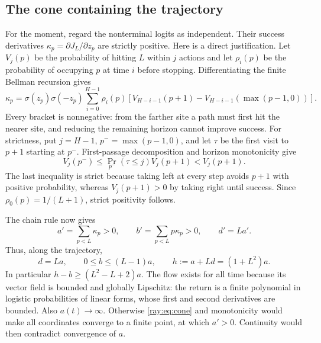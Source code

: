 \documentclass[11pt]{article}
\begin{document}
\subsection{The cone containing the trajectory}
For the moment, regard the nonterminal logits as independent. Their
success derivatives $\kappa_p=\partial J_L/\partial z_p$ are strictly
positive. Here is a direct justification. Let $V_j(p)$ be the probability
of hitting $L$ within $j$ actions and let $\rho_i(p)$ be the probability
of occupying $p$ at time $i$ before stopping. Differentiating the finite
Bellman recursion gives
\[
 \kappa_p=\sigma(z_p)\sigma(-z_p)
 \sum_{i=0}^{H-1}\rho_i(p)
 [V_{H-i-1}(p+1)-V_{H-i-1}(\max(p-1,0))].
\]
Every bracket is nonnegative: from the farther site a path must first
hit the nearer site, and reducing the remaining horizon cannot improve
success. For strictness, put $j=H-1$, $p^-=\max(p-1,0)$, and let $\tau$ be
the first visit to $p+1$ starting at $p^-$. First-passage decomposition and
horizon monotonicity give
\[
 V_j(p^-)\le\Pr_{p^-}(\tau\le j)V_j(p+1)<V_j(p+1).
\]
The last inequality is strict because taking left at every step avoids
$p+1$ with positive probability, whereas $V_j(p+1)>0$ by taking right
until success. Since $\rho_0(p)=1/(L+1)$, strict positivity follows.

The chain rule now gives
\[
 a'=\sum_{p<L}\kappa_p>0,\qquad
 b'=\sum_{p<L}p\kappa_p>0,\qquad d'=La'.
\]
Thus, along the trajectory,
\begin{equation}\label{ray:eq:cone}
 d=La,\qquad 0\le b\le(L-1)a,\qquad
 h:=a+Ld=(1+L^2)a.
\end{equation}
In particular $h-b\ge(L^2-L+2)a$. The flow exists for all time because
its vector field is bounded and globally Lipschitz: the return is a
finite polynomial in logistic probabilities of linear forms, whose first
and second derivatives are bounded.
Also $a(t)\to\infty$. Otherwise \eqref{ray:eq:cone} and monotonicity would
make all coordinates converge to a finite point, at which $a'>0$.
Continuity would then contradict convergence of $a$.
\end{document}
